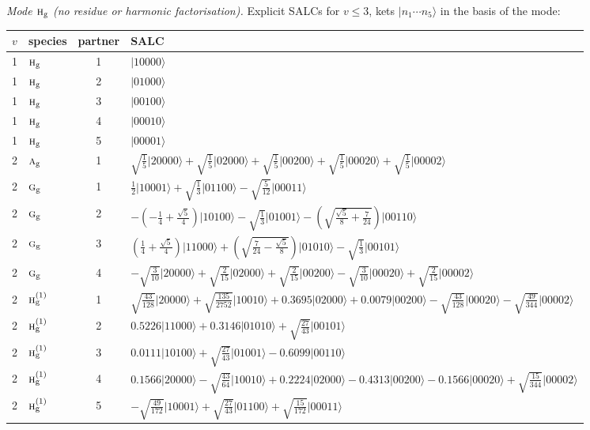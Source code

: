 \documentclass[11pt]{article}
\newcommand{\irr}[1]{\text{\normalfont\scshape #1}}
\newcommand{\ptag}[1]{\mathrm{#1}}
\newcommand{\occ}[1]{\lvert #1\rangle}
\begin{document}
\emph{Mode $\irr{h}_{\ptag{g}}$ (no residue or harmonic factorisation).} Explicit SALCs for $v\le3$, kets $\occ{n_1\cdots n_{5}}$ in the basis of the mode:
\begin{longtable}{c l c p{}}\hline $v$ & species & partner & SALC\\ \hline\endhead
1 & $\irr{h}_{\ptag{g}}$ & 1 & $\occ{10000}$\\
1 & $\irr{h}_{\ptag{g}}$ & 2 & $\occ{01000}$\\
1 & $\irr{h}_{\ptag{g}}$ & 3 & $\occ{00100}$\\
1 & $\irr{h}_{\ptag{g}}$ & 4 & $\occ{00010}$\\
1 & $\irr{h}_{\ptag{g}}$ & 5 & $\occ{00001}$\\
\hline
2 & $\irr{a}_{\ptag{g}}$ & 1 & $\sqrt{\tfrac{1}{5}}\occ{20000}+\sqrt{\tfrac{1}{5}}\occ{02000}+\sqrt{\tfrac{1}{5}}\occ{00200}+\sqrt{\tfrac{1}{5}}\occ{00020}+\sqrt{\tfrac{1}{5}}\occ{00002}$\\
2 & $\irr{g}_{\ptag{g}}$ & 1 & $\tfrac{1}{2}\occ{10001}+\sqrt{\tfrac{1}{3}}\occ{01100}-\sqrt{\tfrac{5}{12}}\occ{00011}$\\
2 & $\irr{g}_{\ptag{g}}$ & 2 & $-(- \frac{1}{4} + \frac{\sqrt{5}}{4})\occ{10100}-\sqrt{\tfrac{1}{3}}\occ{01001}-(\sqrt{\frac{\sqrt{5}}{8} + \frac{7}{24}})\occ{00110}$\\
2 & $\irr{g}_{\ptag{g}}$ & 3 & $(\frac{1}{4} + \frac{\sqrt{5}}{4})\occ{11000}+(\sqrt{\frac{7}{24} - \frac{\sqrt{5}}{8}})\occ{01010}-\sqrt{\tfrac{1}{3}}\occ{00101}$\\
2 & $\irr{g}_{\ptag{g}}$ & 4 & $-\sqrt{\tfrac{3}{10}}\occ{20000}+\sqrt{\tfrac{2}{15}}\occ{02000}+\sqrt{\tfrac{2}{15}}\occ{00200}-\sqrt{\tfrac{3}{10}}\occ{00020}+\sqrt{\tfrac{2}{15}}\occ{00002}$\\
2 & $\irr{h}_{\ptag{g}}^{(1)}$ & 1 & $\sqrt{\tfrac{43}{128}}\occ{20000}+\sqrt{\tfrac{135}{2752}}\occ{10010}+0.3695\occ{02000}+0.0079\occ{00200}-\sqrt{\tfrac{43}{128}}\occ{00020}-\sqrt{\tfrac{49}{344}}\occ{00002}$\\
2 & $\irr{h}_{\ptag{g}}^{(1)}$ & 2 & $0.5226\occ{11000}+0.3146\occ{01010}+\sqrt{\tfrac{27}{43}}\occ{00101}$\\
2 & $\irr{h}_{\ptag{g}}^{(1)}$ & 3 & $0.0111\occ{10100}+\sqrt{\tfrac{27}{43}}\occ{01001}-0.6099\occ{00110}$\\
2 & $\irr{h}_{\ptag{g}}^{(1)}$ & 4 & $0.1566\occ{20000}-\sqrt{\tfrac{43}{64}}\occ{10010}+0.2224\occ{02000}-0.4313\occ{00200}-0.1566\occ{00020}+\sqrt{\tfrac{15}{344}}\occ{00002}$\\
2 & $\irr{h}_{\ptag{g}}^{(1)}$ & 5 & $-\sqrt{\tfrac{49}{172}}\occ{10001}+\sqrt{\tfrac{27}{43}}\occ{01100}+\sqrt{\tfrac{15}{172}}\occ{00011}$\\

\end{longtable}
\end{document}
